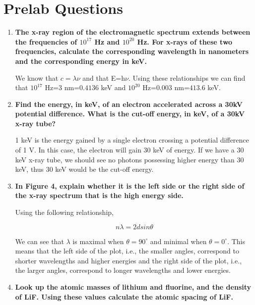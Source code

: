 \section{Prelab Questions}
\begin{enumerate}

\item {\bf The x-ray region of the electromagnetic spectrum extends between the frequencies of $10^{17}$ Hz and $10^{20}$ Hz. For x-rays of these two frequencies, calculate the corresponding wavelength in nanometers and the corresponding energy in keV.}\newline

We know that $c=\lambda\nu$ and that E=h$\nu$. Using these relationships we can find that $10^{17}$ Hz=$3$ nm=$0.4136$ keV and $10^{20}$ Hz=$0.003$ nm=$413.6$ keV.

\item {\bf Find the energy, in keV, of an electron accelerated across a 30kV potential difference. What is the cut-off energy, in keV, of a 30kV x-ray tube?}\newline

1 keV is the energy gained by a single electron crossing a potential difference of 1 V. In this case, the electron will gain 30 keV of energy. If we have a 30 keV x-ray tube, we should see no photons possessing higher energy than 30 keV, thus 30 keV would be the cut-off energy.

\item {\bf In Figure 4, explain whether it is the left side or the right side of the x-ray spectrum that is the high energy side.}\newline

Using the following relationship,

\begin{equation}
n\lambda=2dsin\theta
\label{equ:twcg1}
\end{equation}

We can see that $\lambda$ is maximal when $\theta=90^{\circ}$ and minimal when $\theta=0^{\circ}$. This means that the left side of the plot, i.e., the smaller angles, correspond to shorter wavelengths and higher energies and the right side of the plot, i.e., the larger angles, correspond to longer wavelengths and lower energies.

\item {\bf Look up the atomic masses of lithium and fluorine, and the density of LiF. Using these values calculate the atomic spacing of LiF.}\newline


\end{enumerate}
